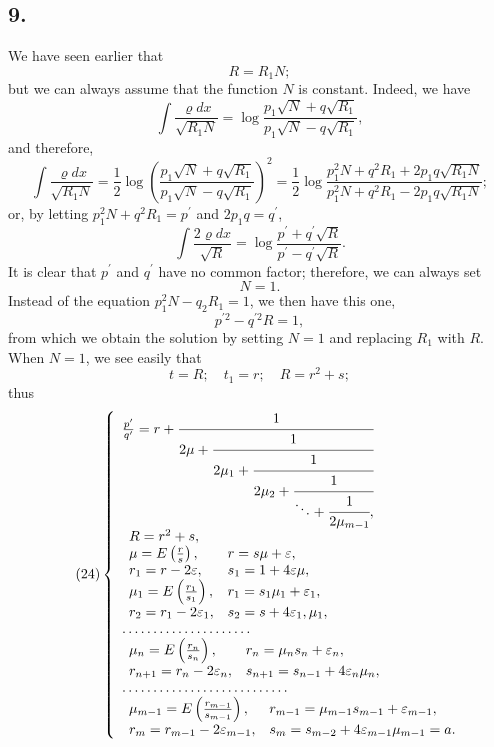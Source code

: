 \documentclass[oneside, 12 pt, leqno]{memoir}
\begin{document}
\subsection*{9.}
%
We have seen earlier that
\[R=R_1 N;\]
but we can always assume that the function \(N\) is constant. Indeed, we have
\[\int \frac{\varrho d x}{\sqrt{R_1 N}}=\log \frac{p_1 \sqrt{N}+q \sqrt{R_1}}{p_1 \sqrt{N}-q \sqrt{R_1}},\]
and therefore,
\[\int \frac{\varrho d x}{\sqrt{R_1 N}}=\frac{1}{2} \log \left(\frac{p_1 \sqrt{N}+q \sqrt{R_1}}{p_1 \sqrt{N}-q \sqrt{R_1}}\right)^2=\frac{1}{2} \log \frac{p_1^2 N+q^2 R_1+2 p_1 q \sqrt{R_1 N}}{p_1^2 N+q^2 R_1-2 p_1 q \sqrt{R_1 N}};\]
or, by letting \(p_1^2 N+q^2 R_1=p^{\prime}\) and \(2 p_1 q=q^{\prime}\),
\[\int \frac{2 \varrho d x}{\sqrt{R}}=\log \frac{p^{\prime}+q^{\prime} \sqrt{R}}{p^{\prime}-q^{\prime} \sqrt{R}}.\]
It is clear that \(p^{\prime}\) and \(q^{\prime}\) have no common factor; therefore, we can always set
\[N=1.\]
Instead of the equation \(p_1^2 N-q_2 R_1=1\), we then have this one,
\[p^{\prime 2}-q^{\prime 2} R=1,\]
from which we obtain the solution by setting \(N=1\) and replacing \(R_1\) with \(R\).
%
When \(N=1\), we see easily that
\[t=R ; \quad t_1=r ; \quad R=r^2+s;\]
thus
\[\tag{24}
\left\{ \begin{array}{l}
 \frac{p^{\prime}}{q^{\prime}}=r+\cfrac{1}{2 \mu+\cfrac{1}{2 \mu_1+\cfrac{1}{2 \mu_2+\cfrac{1}{\ddots+\cfrac{1}{2 \mu_{m-1}},}}}} \\
\begin{array}{ll} R=r^2+s,& \\
 \mu=E\left(\frac{r}{s}\right), & r=s \mu+\varepsilon, \\
 r_1=r-2 \varepsilon,& s_1=1+4 \varepsilon \mu, \\
 \mu_1=E\left(\frac{r_1}{s_1}\right), & r_1=s_1 \mu_1+\varepsilon_1, \\
 r_2=r_1-2 \varepsilon_1, & s_2=s+4 \varepsilon_1, \mu_1 , \end{array}\\
 \dots \dots \dots \dots \dots \dots \dots\\
\begin{array}{ll} \mu_n=E\left(\frac{r_n}{s_n}\right), & r_n=\mu_n s_n+\varepsilon_n, \\
 r_{n+1}=r_n-2 \varepsilon_n, &s_{n+1}=s_{n-1}+4 \varepsilon_n \mu_n , \end{array} \\
 \dots \dots \dots \dots \dots \dots \dots \dots \dots \\
 \begin{array}{ll} \mu_{m-1}=E\left(\frac{r_{m-1}}{s_{m-1}}\right), & r_{m-1}=\mu_{m-1} s_{m-1}+\varepsilon_{m-1}, \\
 r_m=r_{m-1}-2 \varepsilon_{m-1}, & s_m=s_{m-2}+4 \varepsilon_{m-1} \mu_{m-1}=a. \end{array}
\end{array}\right.\]
\end{document}
